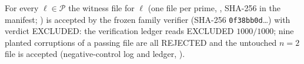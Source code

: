 For every $\ell\in\mathcal P$ the witness file for $\ell$ (one file per prime, , SHA-256 in the manifest; ) is accepted by the frozen family verifier (SHA-256 \texttt{0f38bb0d}\ldots) with verdict EXCLUDED: the verification ledger reads EXCLUDED $1000/1000$; nine planted corruptions of a passing file are all REJECTED and the untouched $n=2$ file is accepted (negative-control log and ledger, ).

